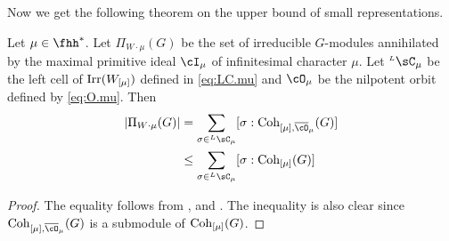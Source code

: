 \documentclass[counting_main.tex]{subfiles}
\begin{document}
\medskip

Now we get the following theorem on the upper bound of small representations.
\begin{thm}
  Let $\mu\in \fhh^{*}$. Let $\Pi_{W\cdot \mu}(G)$ be the set of irreducible
  $G$-modules annihilated by the maximal primitive ideal $\cI_{\mu}$ of
  infinitesimal character $\mu$. Let $\LC_{\mu}$ be the left cell of
  $\mathrm{Irr}(W_{[\mu]})$ defined in \eqref{eq:LC.mu} and $\cO_{\mu}$ be the nilpotent
  orbit defined by \eqref{eq:O.mu}. Then
  \[
    \begin{split}
      \abs{\Pi_{W\cdot \mu}(G)} &= \sum_{\sigma\in \LC_{\mu}}
      [\sigma:\Coh_{[\mu],\bcO_{\mu}}(G)]\\
      &\leq \sum_{\sigma\in \LC_{\mu}}
      [\sigma:\Coh_{[\mu]}(G)]\\
    \end{split}
  \]
\end{thm}
\begin{proof}
  The equality follows from ,  and
  . The inequality is also clear since
  $\Coh_{[\mu],\bcO_{\mu}}(G)$ is a submodule of $\mathrm{Coh}_{[\mu]}(G)$.
\end{proof}




\end{document}
